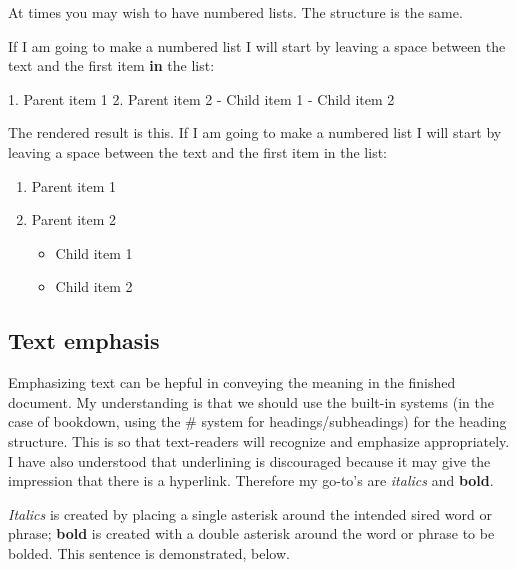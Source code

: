 \documentclass[
]{book}
\newenvironment{Shaded}{\begin{snugshade}}{\end{snugshade}}
\newcommand{\ControlFlowTok}[1]{\textcolor[rgb]{0.13,0.29,0.53}{\textbf{#1}}}
\newcommand{\DecValTok}[1]{\textcolor[rgb]{0.00,0.00,0.81}{#1}}
\newcommand{\FloatTok}[1]{\textcolor[rgb]{0.00,0.00,0.81}{#1}}
\newcommand{\NormalTok}[1]{#1}
\newcommand{\SpecialCharTok}[1]{\textcolor[rgb]{0.00,0.00,0.00}{#1}}
\providecommand{\tightlist}{%
  \setlength{\itemsep}{0pt}\setlength{\parskip}{0pt}}
\begin{document}
At times you may wish to have numbered lists. The structure is the same.

\begin{Shaded}
\begin{Highlighting}[]
\NormalTok{If I am going to make a numbered list I will start by leaving a space between the text and the first item }\ControlFlowTok{in}\NormalTok{ the list}\SpecialCharTok{:}
  
\FloatTok{1.}\NormalTok{ Parent item }\DecValTok{1}
\FloatTok{2.}\NormalTok{ Parent item }\DecValTok{2}
   \SpecialCharTok{{-}}\NormalTok{ Child item }\DecValTok{1}
   \SpecialCharTok{{-}}\NormalTok{ Child item }\DecValTok{2}
\end{Highlighting}
\end{Shaded}

The rendered result is this. If I am going to make a numbered list I will start by leaving a space between the text and the first item in the list:

\begin{enumerate}
\def\labelenumi{\arabic{enumi}.}
\tightlist
\item
  Parent item 1
\item
  Parent item 2

  \begin{itemize}
  \tightlist
  \item
    Child item 1
  \item
    Child item 2
  \end{itemize}
\end{enumerate}

\hypertarget{text-emphasis}{%
\subsection{Text emphasis}\label{text-emphasis}}

Emphasizing text can be hepful in conveying the meaning in the finished document. My understanding is that we should use the built-in systems (in the case of bookdown, using the \# system for headings/subheadings) for the heading structure. This is so that text-readers will recognize and emphasize appropriately. I have also understood that underlining is discouraged because it may give the impression that there is a hyperlink. Therefore my go-to's are \emph{italics} and \textbf{bold}.

\emph{Italics} is created by placing a single asterisk around the intended sired word or phrase; \textbf{bold} is created with a double asterisk around the word or phrase to be bolded. This sentence is demonstrated, below.
\end{document}
